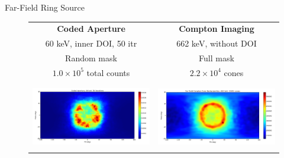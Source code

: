 \documentclass[xcolor=x11names,compress]{beamer}
\renewcommand{\(}{\begin{columns}}
\renewcommand{\)}{\end{columns}}
\newcommand{\<}[1]{\begin{column}{#1}}
\renewcommand{\>}{\end{column}}
\begin{document}
\begin{frame}{Far-Field Ring Source}

\vspace{-2ex}
\begin{figure}
\begin{tabular}{cc}
	\textbf{Coded Aperture} & \textbf{Compton Imaging} \\
	60 keV, inner DOI, 50 itr & 662 keV, without DOI \\
	Random mask & Full mask \\
	$1.0\times10^5$ total counts & $2.2 \times10^4$ cones \\
	&\\
	\includegraphics[height=80pt, width=160pt]{Figures/FarfieldRing_60_DOI.png} & 
	\includegraphics[height=80pt, width=160pt]{Figures/FarfieldRing_662.png} \\
\end{tabular}
\end{figure}

\end{frame}
\end{document}
